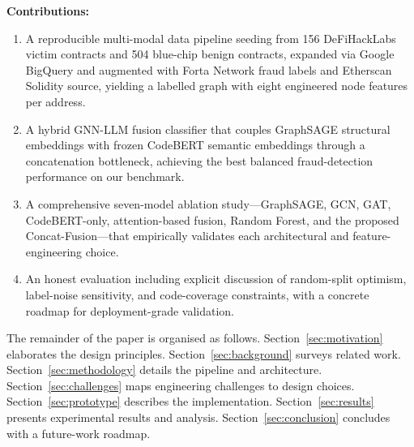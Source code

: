 \textbf{Contributions:}
\begin{enumerate}
  \item A reproducible multi-modal data pipeline seeding from
  156 DeFiHackLabs victim contracts and 504 blue-chip benign contracts,
  expanded via Google BigQuery and augmented with Forta Network fraud
  labels and Etherscan Solidity source, yielding a labelled graph with
  eight engineered node features per address.

  \item A hybrid GNN-LLM fusion classifier that couples GraphSAGE
  structural embeddings with frozen CodeBERT semantic embeddings through
  a concatenation bottleneck, achieving the best balanced fraud-detection
  performance on our benchmark.

  \item A comprehensive seven-model ablation study---GraphSAGE, GCN,
  GAT, CodeBERT-only, attention-based fusion, Random Forest, and the
  proposed Concat-Fusion---that empirically validates each architectural
  and feature-engineering choice.

  \item An honest evaluation including explicit discussion of random-split
  optimism, label-noise sensitivity, and code-coverage constraints, with
  a concrete roadmap for deployment-grade validation.
\end{enumerate}

The remainder of the paper is organised as follows.
Section~\ref{sec:motivation} elaborates the design principles.
Section~\ref{sec:background} surveys related work.
Section~\ref{sec:methodology} details the pipeline and architecture.
Section~\ref{sec:challenges} maps engineering challenges to design choices.
Section~\ref{sec:prototype} describes the implementation.
Section~\ref{sec:results} presents experimental results and analysis.
Section~\ref{sec:conclusion} concludes with a future-work roadmap.
